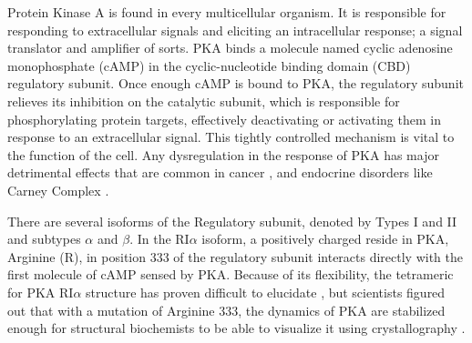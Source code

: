 \documentclass[12pt]{ucsddissertation}
\begin{document}
\begin{dissertationintroduction}
Protein Kinase A is found in every multicellular organism. It is responsible for responding to extracellular signals and eliciting an intracellular response; a signal translator and amplifier of sorts. PKA binds a molecule named cyclic adenosine monophosphate (cAMP) in the cyclic-nucleotide binding domain (CBD) regulatory subunit. Once enough cAMP is bound to PKA, the regulatory subunit relieves its inhibition on the catalytic subunit, which is responsible for phosphorylating protein targets, effectively deactivating or activating them in response to an extracellular signal. This tightly controlled mechanism is vital to the function of the cell. Any dysregulation in the response of PKA has major detrimental effects that are common in cancer \cite{Caretta2011}, and endocrine disorders like Carney Complex \cite{Horvath2010}.


There are several isoforms of the Regulatory subunit, denoted by Types I and II and subtypes $\alpha$ and $\beta$. In the RI$\alpha$ isoform, a positively charged reside in PKA, Arginine (R), in position 333 of the regulatory subunit interacts directly with the first molecule of cAMP sensed by PKA. Because of its flexibility, the tetrameric for PKA RI$\alpha$ structure has proven difficult to elucidate \cite{Kim2005}, but scientists figured out that with a mutation of Arginine 333, the dynamics of PKA are stabilized enough for structural biochemists to be able to visualize it using crystallography \cite{Kim2007}.


\end{dissertationintroduction}
\end{document}
